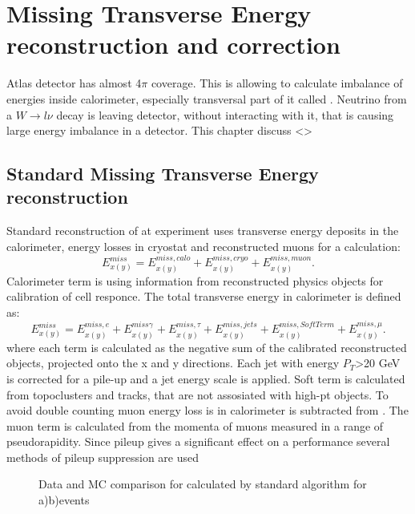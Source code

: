 \chapter{Missing Transverse Energy reconstruction and correction}
Atlas detector has almost 4$\pi$ coverage. This is allowing to calculate imbalance of energies inside calorimeter, especially transversal part of it called \etmiss.  Neutrino from a $W \to l\nu$ decay is leaving detector, without interacting with it, that is causing large energy imbalance in a detector. This chapter discuss <>

\section{Standard Missing Transverse Energy reconstruction}
Standard reconstruction of \etmiss at \atlas experiment uses transverse energy deposits in the calorimeter, energy losses in cryostat and reconstructed muons for a calculation:
\begin{equation}
E_{x(y)}^{miss} = E_{x(y)}^{miss, calo} +  E_{x(y)}^{miss, cryo} +  E_{x(y)}^{miss, muon}.
\end{equation}
Calorimeter term is using information from reconstructed physics objects for calibration of cell responce. The total transverse energy in calorimeter is defined as:
\begin{equation}
E_{x(y)}^{miss} = E_{x(y)}^{miss, e} + E_{x(y)}^{miss \gamma} + E_{x(y)}^{miss, \tau} + E_{x(y)}^{miss, jets} + E_{x(y)}^{miss,SoftTerm} + E_{x(y)}^{miss, \mu}.
\end{equation}
where each term is calculated as the negative sum of the calibrated reconstructed objects, projected onto the x and y directions. Each jet with energy $P_T$>20 GeV is corrected for a pile-up and a jet energy scale is applied. Soft term is calculated from topoclusters and tracks, that are not assosiated with high-pt objects. To avoid double counting muon energy loss is in calorimeter is  subtracted from \etmiss.  The \etmiss muon term is calculated from the momenta of muons measured in a range of pseudorapidity. Since pileup gives a significant effect on a \etmiss performance several methods of pileup suppression are used

\begin{figure}[!tbp]
\begin{minipage}[h]{0.49\linewidth}
\end{minipage}
\hfill
\begin{minipage}[h]{0.49\linewidth}
\end{minipage}
\caption{Data and MC comparison for \etmiss calculated by standard \atlas algorithm for a)\wenu b)\wmunu events}
\label{ris:EtMissRefFinal}
\end{figure}

